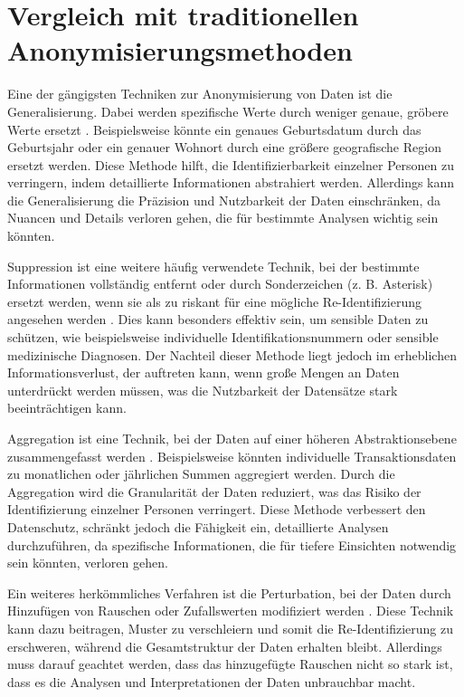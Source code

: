 \section{Vergleich mit traditionellen Anonymisierungsmethoden}
\label{sec:traditionelle-anonymisierung}
\begin{spacing}{1.5}

Eine der gängigsten Techniken zur Anonymisierung von Daten ist die Generalisierung. Dabei werden spezifische Werte durch weniger genaue, gröbere Werte ersetzt \cite[33]{schwartmann_praxisleitfaden_2022}. Beispielsweise könnte ein genaues Geburtsdatum durch das Geburtsjahr oder ein genauer Wohnort durch eine größere geografische Region ersetzt werden. Diese Methode hilft, die Identifizierbarkeit einzelner Personen zu verringern, indem detaillierte Informationen abstrahiert werden. Allerdings kann die Generalisierung die Präzision und Nutzbarkeit der Daten einschränken, da Nuancen und Details verloren gehen, die für bestimmte Analysen wichtig sein könnten.

Suppression ist eine weitere häufig verwendete Technik, bei der bestimmte Informationen vollständig entfernt oder durch Sonderzeichen (z. B. Asterisk) ersetzt werden, wenn sie als zu riskant für eine mögliche Re-Identifizierung angesehen werden \cite[1155]{lei_xu_information_2014}. Dies kann besonders effektiv sein, um sensible Daten zu schützen, wie beispielsweise individuelle Identifikationsnummern oder sensible medizinische Diagnosen. Der Nachteil dieser Methode liegt jedoch im erheblichen Informationsverlust, der auftreten kann, wenn große Mengen an Daten unterdrückt werden müssen, was die Nutzbarkeit der Datensätze stark beeinträchtigen kann.

Aggregation ist eine Technik, bei der Daten auf einer höheren Abstraktionsebene zusammengefasst werden \cite[11]{gumz_anonymisierung_2019}. Beispielsweise könnten individuelle Transaktionsdaten zu monatlichen oder jährlichen Summen aggregiert werden. Durch die Aggregation wird die Granularität der Daten reduziert, was das Risiko der Identifizierung einzelner Personen verringert. Diese Methode verbessert den Datenschutz, schränkt jedoch die Fähigkeit ein, detaillierte Analysen durchzuführen, da spezifische Informationen, die für tiefere Einsichten notwendig sein könnten, verloren gehen.

Ein weiteres herkömmliches Verfahren ist die Perturbation, bei der Daten durch Hinzufügen von Rauschen oder Zufallswerten modifiziert werden \cite[1155]{lei_xu_information_2014}. Diese Technik kann dazu beitragen, Muster zu verschleiern und somit die Re-Identifizierung zu erschweren, während die Gesamtstruktur der Daten erhalten bleibt. Allerdings muss darauf geachtet werden, dass das hinzugefügte Rauschen nicht so stark ist, dass es die Analysen und Interpretationen der Daten unbrauchbar macht.


\end{spacing}
